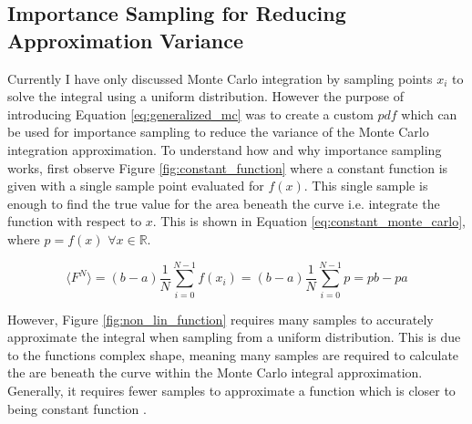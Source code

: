 \documentclass[ %
                    author={Callum Pearce},
                supervisor={Dr. Neill Campbell},
                    degree={MEng},
                     title={How effective are Temporal difference learning methods for reducing the number of zero contribution light paths, while still accurately approximating Global Illumination in Path tracing?},
                  subtitle={},
                      type={research},
                      year={2019} ]{dissertation}
\begin{document}
\subsection{Importance Sampling for Reducing Approximation Variance}
\label{sec:importance_smapling}

Currently I have only discussed Monte Carlo integration by sampling points $x_i$ to solve the integral using a uniform distribution. However the purpose of introducing Equation \ref{eq:generalized_mc} was to create a custom $pdf$ which can be used for importance sampling to reduce the variance of the Monte Carlo integration approximation. To understand how and why importance sampling works, first observe Figure \ref{fig:constant_function} where a constant function is given with a single sample point evaluated for $f(x)$. This single sample is enough to find the true value for the area beneath the curve i.e. integrate the function with respect to $x$. This is shown in Equation \ref{eq:constant_monte_carlo}, where $p = f(x)$ $ \forall x \in \mathbb{R}$.

\begin{equation}
\label{eq:constant_monte_carlo}
\langle F^N \rangle = (b - a) \frac{1}{N} \sum^{N-1}_{i=0} f(x_i) = (b - a)  \frac{1}{N} \sum^{N-1}_{i=0} p = pb - pa
\end{equation}

However, Figure \ref{fig:non_lin_function} requires many samples to accurately approximate the integral when sampling from a uniform distribution. This is due to the functions complex shape, meaning many samples are required to calculate the are beneath the curve within the Monte Carlo integral approximation. Generally, it requires fewer samples to approximate a function which is closer to being constant function \cite{morokoff1995quasi}.
\end{document}
